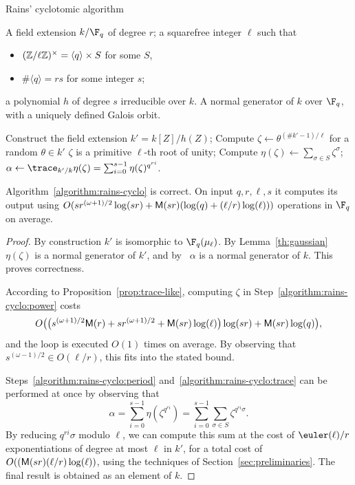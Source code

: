 \begin{algorithm}
  \caption{Rains' cyclotomic algorithm}
  \label{algorithm:rains-cyclo}
  \begin{algorithmic}[1]
    \REQUIRE A field extension $k/\F_q$ of degree $r$; a squarefree
    integer $\ell$ such that
    \begin{itemize}
    \item $(\mathbb{Z}/\ell\mathbb{Z})^\times = \langle q\rangle \times S$ for some $S$,
    \item $\#\langle q\rangle = rs$ for some integer $s$;
    \end{itemize}
    a polynomial $h$ of degree $s$ irreducible over $k$.
    \ENSURE A normal generator of $k$ over $\F_q$,
    with a uniquely defined Galois orbit.
    
    \STATE Construct the field extension $k'=k[Z]/h(Z)$;
    \REPEAT
    \STATE\label{algorithm:rains-cyclo:power} Compute $\zeta\leftarrow \theta^{(\#k'-1)/\ell}$ for a random $\theta\in k'$
    \UNTIL $\zeta$ is a primitive $\ell$-th root of unity;
    \STATE\label{algorithm:rains-cyclo:period} Compute $\eta(\zeta) \leftarrow \sum_{\sigma\in S}\zeta^\sigma$;
    \RETURN\label{algorithm:rains-cyclo:trace} $\alpha \leftarrow \trace_{k'/k}\eta(\zeta) = \sum_{i=0}^{s-1}\eta(\zeta)^{q^{ri}}$.
  \end{algorithmic}
\end{algorithm}

\begin{proposition}
  Algorithm~\ref{algorithm:rains-cyclo} is correct. On input
  $q,r,\ell,s$ it computes its output using
  $O(sr^{(\omega+1)/2}\log(sr) + \mathsf{M}(sr)(\log(q) + (\ell/r)\log(\ell)))$ operations in $\F_q$ on average.
\end{proposition}
\begin{proof}
  By construction $k'$ is isomorphic to $\F_q(\mu_\ell)$. By
  Lemma~\ref{th:gaussian} $\eta(\zeta)$ is a normal generator of $k'$,
  and by~\cite[Prop.~5.2.3.1]{mullen2013handbook} $\alpha$ is a
  normal generator of $k$. This proves correctness.

  According to Proposition~\ref{prop:trace-like}, computing $\zeta$
  in Step~\ref{algorithm:rains-cyclo:power}
  costs
  $$O\bigl(\bigl(s^{(\omega+1)/2}\mathsf{M}(r) + sr^{(\omega+1)/2}
  +\mathsf{M}(sr)\log(\ell)\bigr)\log(sr)+\mathsf{M}(sr)\log(q)\bigr),
  $$
  and the loop is executed $O(1)$ times on average. %
  By observing that $s^{(\omega-1)/2}\in O(\ell/r)$, this fits into
  the stated bound.
  
  Steps~\ref{algorithm:rains-cyclo:period}
  and~\ref{algorithm:rains-cyclo:trace} can be performed at once by
  observing that
  \[\alpha = \sum_{i=0}^{s-1}\eta(\zeta^{q^{ri}})= \sum_{i=0}^{s-1}\sum_{\sigma\in S}\zeta^{q^{ri}\sigma}.\]
  By reducing $q^{ri}\sigma$ modulo $\ell$, we can compute this sum at
  the cost of $\euler(\ell)/r$ exponentiations of degree at most
  $\ell$ in $k'$, for a total cost of
  $O((\mathsf{M}(sr)(\ell/r)\log(\ell))$,
  using the techniques of Section~\ref{sec:preliminaries}.
  The final result is obtained as an element of $k$.
\end{proof}

